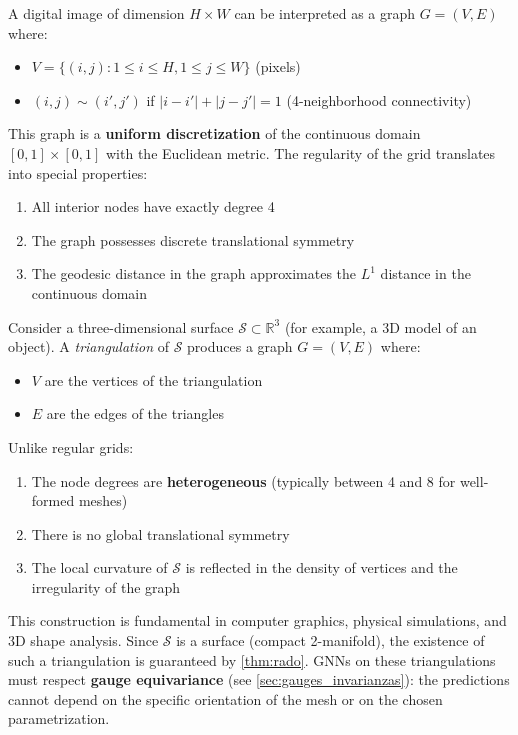 \begin{example}\label{ex:imagen_grafo_grilla}
	A digital image of dimension $H \times W$ can be interpreted as a graph $G = (V,E)$ where:
	\begin{itemize}
		\item $V = \{(i,j) : 1 \leq i \leq H, 1 \leq j \leq W\}$ (pixels)
		\item $(i,j) \sim (i',j')$ if $|i-i'| + |j-j'| = 1$ (4-neighborhood connectivity)
	\end{itemize}

	This graph is a \textbf{uniform discretization} of the continuous domain $[0,1] \times [0,1]$ with the Euclidean metric. The regularity of the grid translates into special properties:
	\begin{enumerate}
		\item All interior nodes have exactly degree 4
		\item The graph possesses discrete translational symmetry
		\item The geodesic distance in the graph approximates the $L^1$ distance in the continuous domain
	\end{enumerate}
\end{example}

\begin{example}\label{ex:superficie_triangulada}
	Consider a three-dimensional surface $\mathcal{S} \subset \mathbb{R}^3$ (for example, a 3D model of an object). A \textit{triangulation} of $\mathcal{S}$ produces a graph $G = (V,E)$ where:
	\begin{itemize}
		\item $V$ are the vertices of the triangulation
		\item $E$ are the edges of the triangles
	\end{itemize}

	Unlike regular grids:
	\begin{enumerate}
		\item The node degrees are \textbf{heterogeneous} (typically between 4 and 8 for well-formed meshes)
		\item There is no global translational symmetry
		\item The local curvature of $\mathcal{S}$ is reflected in the density of vertices and the irregularity of the graph
	\end{enumerate}

	This construction is fundamental in computer graphics, physical simulations, and 3D shape analysis. Since $\mathcal{S}$ is a surface (compact 2-manifold), the existence of such a triangulation is guaranteed by \autoref{thm:rado}. \glspl{GNN} on these triangulations must respect \textbf{gauge equivariance} (see \autoref{sec:gauges_invarianzas}): the predictions cannot depend on the specific orientation of the mesh or on the chosen parametrization.
\end{example}

